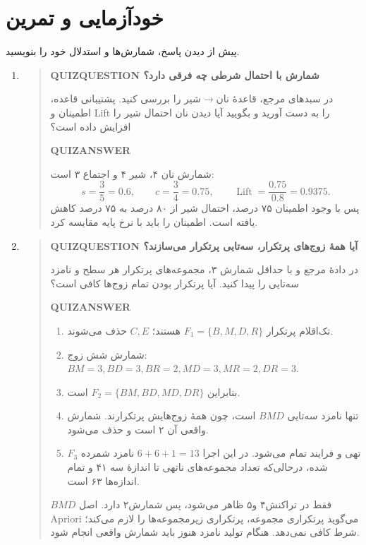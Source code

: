 \section{خودآزمایی و تمرین}
پیش از دیدن پاسخ، شمارش‌ها و استدلال خود را بنویسید.
\begin{enumerate}
\item\begin{quote}\textbf{QUIZQUESTION شمارش با احتمال شرطی چه فرقی دارد؟}\par 
در سبدهای مرجع، قاعدهٔ نان$\to$شیر را بررسی کنید. پشتیبانی قاعده، اطمینان و Lift را به دست آورید و بگویید آیا دیدن نان احتمال شیر را افزایش داده است؟
\par\textbf{QUIZANSWER}\par شمارش نان ۴، شیر ۴ و اجتماع ۳ است:
\[s=\frac35=0.6,\qquad c=\frac34=0.75,\qquad\operatorname{Lift}=\frac{0.75}{0.8}=0.9375.\]
پس با وجود اطمینان ۷۵ درصد، احتمال شیر از ۸۰ درصد به ۷۵ درصد کاهش یافته است. اطمینان را باید با نرخ پایه مقایسه کرد.\par 
\end{quote}

\item\begin{quote}\textbf{QUIZQUESTION آیا همهٔ زوج‌های پرتکرار، سه‌تایی پرتکرار می‌سازند؟}\par 
در دادهٔ مرجع و با حداقل شمارش ۳، مجموعه‌های پرتکرار هر سطح و نامزد سه‌تایی را پیدا کنید. آیا پرتکرار بودن تمام زوج‌ها کافی است؟
\par\textbf{QUIZANSWER}\par \begin{enumerate}
\item تک‌اقلام پرتکرار $F_1=\{B,M,D,R\}$ هستند؛ $C,E$ حذف می‌شوند.
\item شمارش شش زوج: $BM=3,BD=3,BR=2,MD=3,MR=2,DR=3$.
\item بنابراین $F_2=\{BM,BD,MD,DR\}$ است.
\item تنها نامزد سه‌تایی $BMD$ است، چون همهٔ زوج‌هایش پرتکرارند. شمارش واقعی آن ۲ است و حذف می‌شود.
\item $F_3$ تهی و فرایند تمام می‌شود. در این اجرا $6+6+1=13$ نامزد شمرده شده، درحالی‌که تعداد مجموعه‌های ناتهی تا اندازهٔ سه ۴۱ و تمام اندازه‌ها ۶۳ است.
\end{enumerate}


 $BMD$ فقط در تراکنش۴ و۵ ظاهر می‌شود، پس شمارش۲ دارد. اصل Apriori می‌گوید پرتکراری مجموعه، پرتکراری زیرمجموعه‌ها را لازم می‌کند؛ شرط کافی نمی‌دهد. هنگام تولید نامزد هنوز باید شمارش واقعی انجام شود.\par 
\end{quote}


\end{enumerate}
